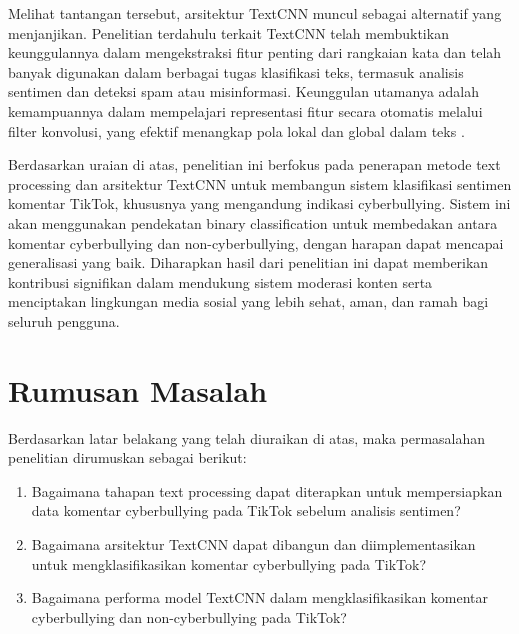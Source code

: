Melihat tantangan tersebut, arsitektur TextCNN muncul sebagai alternatif yang menjanjikan. Penelitian terdahulu terkait TextCNN telah membuktikan keunggulannya dalam mengekstraksi fitur penting dari rangkaian kata dan telah banyak digunakan dalam berbagai tugas klasifikasi teks, termasuk analisis sentimen dan deteksi spam atau misinformasi. Keunggulan utamanya adalah kemampuannya dalam mempelajari representasi fitur secara otomatis melalui filter konvolusi, yang efektif menangkap pola lokal dan global dalam teks \cite{chen2015convolutional}.

Berdasarkan uraian di atas, penelitian ini berfokus pada penerapan metode text processing dan arsitektur TextCNN untuk membangun sistem klasifikasi sentimen komentar TikTok, khususnya yang mengandung indikasi cyberbullying. Sistem ini akan menggunakan pendekatan binary classification untuk membedakan antara komentar cyberbullying dan non-cyberbullying, dengan harapan dapat mencapai generalisasi yang baik. Diharapkan hasil dari penelitian ini dapat memberikan kontribusi signifikan dalam mendukung sistem moderasi konten serta menciptakan lingkungan media sosial yang lebih sehat, aman, dan ramah bagi seluruh pengguna.

\section{Rumusan Masalah} \label{I.Rumusan Masalah}

Berdasarkan latar belakang yang telah diuraikan di atas, maka permasalahan penelitian dirumuskan sebagai berikut: \par

\begin{enumerate}[noitemsep]
    \item Bagaimana tahapan text processing dapat diterapkan untuk mempersiapkan data komentar cyberbullying pada TikTok sebelum analisis sentimen?
	\item Bagaimana arsitektur TextCNN dapat dibangun dan diimplementasikan untuk mengklasifikasikan komentar cyberbullying pada TikTok?
    \item Bagaimana performa model TextCNN dalam mengklasifikasikan komentar cyberbullying dan non-cyberbullying pada TikTok?
\end{enumerate}

